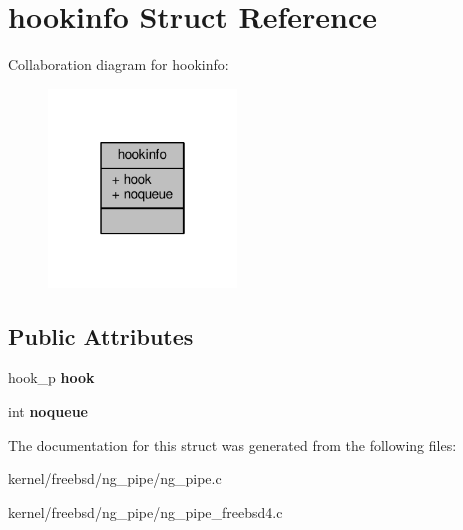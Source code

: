 \hypertarget{structhookinfo}{\section{hookinfo Struct Reference}
\label{structhookinfo}
}


Collaboration diagram for hookinfo\+:
\nopagebreak
\begin{figure}[H]
\begin{center}
\leavevmode
\includegraphics[width=142pt]{structhookinfo__coll__graph}
\end{center}
\end{figure}
\subsection*{Public Attributes}
\begin{DoxyCompactItemize}
\item 
\hypertarget{structhookinfo_a559316d97849415c26896b5422face0e}{hook\+\_\+p {\bfseries hook}}\label{structhookinfo_a559316d97849415c26896b5422face0e}

\item 
\hypertarget{structhookinfo_ab21732daf5d99e3525571d4656af18c2}{int {\bfseries noqueue}}\label{structhookinfo_ab21732daf5d99e3525571d4656af18c2}

\end{DoxyCompactItemize}


The documentation for this struct was generated from the following files\+:\begin{DoxyCompactItemize}
\item 
kernel/freebsd/ng\+\_\+pipe/ng\+\_\+pipe.\+c\item 
kernel/freebsd/ng\+\_\+pipe/ng\+\_\+pipe\+\_\+freebsd4.\+c\end{DoxyCompactItemize}
